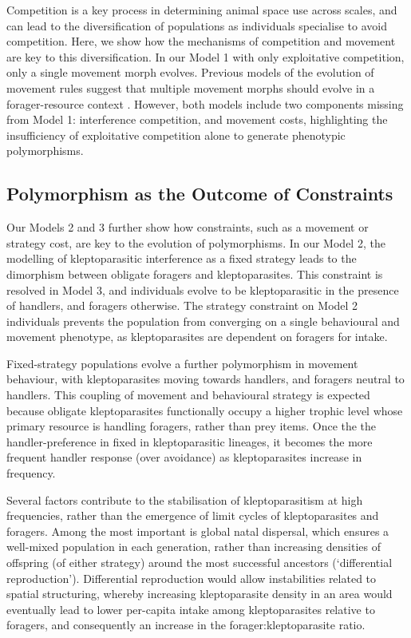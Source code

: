 \documentclass[11pt]{article}
\begin{document}
Competition is a key process in determining animal space use across scales, and can lead to the diversification of populations as individuals specialise to avoid competition.
Here, we show how the mechanisms of competition and movement are key to this diversification.
In our Model 1 with only exploitative competition, only a single movement morph evolves.
Previous models of the evolution of movement rules suggest that multiple movement morphs should evolve in a forager-resource context \citep[][Netz et al. in prep.]{getz2015}.
However, both models include two components missing from Model 1: interference competition, and movement costs, highlighting the insufficiency of exploitative competition alone to generate phenotypic polymorphisms.

\subsection{Polymorphism as the Outcome of Constraints}

Our Models 2 and 3 further show how constraints, such as a movement or strategy cost, are key to the evolution of polymorphisms.
In our Model 2, the modelling of kleptoparasitic interference as a fixed strategy leads to the dimorphism between obligate foragers and kleptoparasites.
This constraint is resolved in Model 3, and individuals evolve to be kleptoparasitic in the presence of handlers, and foragers otherwise.
The strategy constraint on Model 2 individuals prevents the population from converging on a single behavioural and movement phenotype, as kleptoparasites are dependent on foragers for intake.

Fixed-strategy populations evolve a further polymorphism in movement behaviour, with kleptoparasites moving towards handlers, and foragers neutral to handlers.
This coupling of movement and behavioural strategy is expected because obligate kleptoparasites functionally occupy a higher trophic level whose primary resource is handling foragers, rather than prey items.
Once the the handler-preference in fixed in kleptoparasitic lineages, it becomes the more frequent handler response (over avoidance) as kleptoparasites increase in frequency.

Several factors contribute to the stabilisation of kleptoparasitism at high frequencies, rather than the emergence of limit cycles of kleptoparasites and foragers.
Among the most important is global natal dispersal, which ensures a well-mixed population in each generation, rather than increasing densities of offspring (of either strategy) around the most successful ancestors (`differential reproduction').
Differential reproduction would allow instabilities related to spatial structuring, whereby increasing  kleptoparasite density in an area would eventually lead to lower per-capita intake among kleptoparasites relative to foragers, and consequently an increase in the forager:kleptoparasite ratio.
\end{document}
